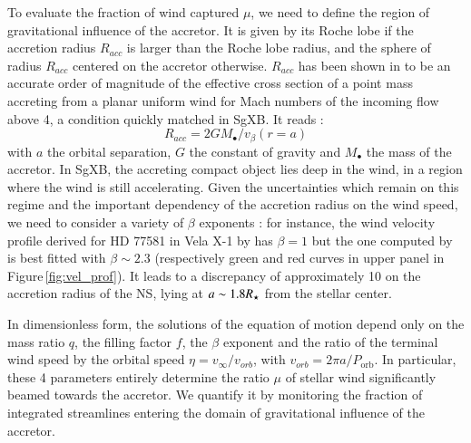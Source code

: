 \documentclass[letter]{aa}
\makeatletter
\newcommand{\sgx}{SgXB\xspace}
\newcommand*{\ns}{NS\@\xspace}
\newcommand{\mystar}{{\fontfamily{lmr}\selectfont$\star$}}
\makeatother
\begin{document}
To evaluate the fraction of wind captured $\mu$, we need to define the region of gravitational influence of the accretor. It is given by its Roche lobe if the accretion radius $R_{acc}$ is larger than the Roche lobe radius, and the sphere of radius $R_{acc}$ centered on the accretor otherwise. $R_{acc}$ has been shown in \cite{ElMellah2015} to be an accurate order of magnitude of the effective cross section of a point mass accreting from a planar uniform wind for Mach numbers of the incoming flow above 4, a condition quickly matched in \sgx. It reads :
\begin{equation}
R_{acc}=2GM_{\bullet}/v_{\beta}(r=a)
\end{equation}
with $a$ the orbital separation, $G$ the constant of gravity and $M_{\bullet}$ the mass of the accretor. In \sgx, the accreting compact object lies deep in the wind, in a region where the wind is still accelerating. Given the uncertainties which remain on this regime and the important dependency of the accretion radius on the wind speed, we need to consider a variety of $\beta$ exponents : for instance, the wind velocity profile derived for HD 77581 in Vela X-1 by \cite{Gimenez-Garcia2016} has $\beta=1$ but the one computed by \cite{Sander2017} is best fitted with $\beta\sim 2.3$ (respectively green and red curves in upper panel in Figure\,\ref{fig:vel_prof}). It leads to a discrepancy of approximately 10 on the accretion radius of the \ns, lying at $a\sim1.8R_{\text{\mystar}}$ from the stellar center.

In dimensionless form, the solutions of the equation of motion depend only on the mass ratio $q$, the filling factor $f$, the $\beta$ exponent and the ratio of the terminal wind speed by the orbital speed $\eta=v_{\infty}/v_{orb}$, with $v_{orb}=2\pi a/P_{\text{orb}}$. In particular, these 4 parameters entirely determine the ratio $\mu$ of stellar wind significantly beamed towards the accretor. We quantify it by monitoring the fraction of integrated streamlines entering the domain of gravitational influence of the accretor.

%
%
%
\end{document}
